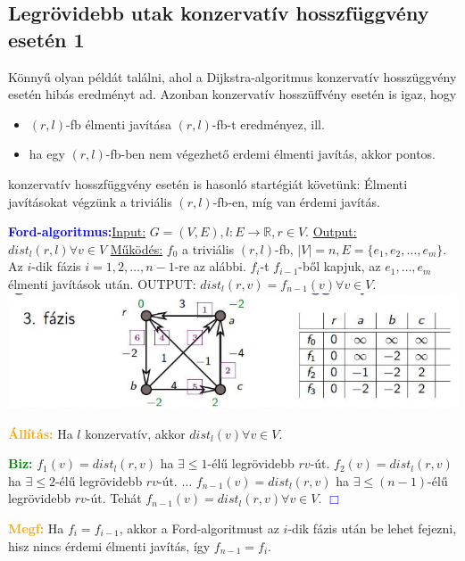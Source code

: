 \documentclass[../szamtud.tex]{subfiles}
\begin{document}
   \subsection{Legrövidebb utak konzervatív hosszfüggvény esetén 1}

        Könnyű olyan példát találni, ahol a Dijkstra-algoritmus konzervatív hosszüggvény esetén hibás eredményt ad. Azonban konzervatív hosszüffvény esetén is igaz, hogy 

        \begin{itemize}
            \item $(r,l)$-fb élmenti javítása $(r,l)$-fb-t eredményez, ill. 
            \item ha egy $(r,l)$-fb-ben nem végezhető erdemi élmenti javítás, akkor pontos.
        \end{itemize}

        konzervatív hosszfüggvény esetén is hasonló startégiát követünk: Élmenti javításokat végzünk a triviális $(r,l)$-fb-en, míg van érdemi javítás.

        \textcolor{blue}{\textbf{Ford-algoritmus:}}\underline{Input:} $G = (V,E), l:E \rightarrow \mathbb{R},r \in V$. \underline{Output:} $dist_l(r,l) \forall v \in V$ \underline{Működés:} $f_0$ a triviális $(r,l)$-fb, $|V| = n, E = \{e_1, e_2, \dots, e_m\}$. Az $i$-dik fázis $i = 1,2,\dots,n-1$-re az alábbi. $f_i$-t $f_{i-1}$-ből kapjuk, az $e_1,\dots,e_m$ élmenti javítások után. OUTPUT: $dist_l(r,v)=f_{n-1}(v) \forall v \in V$. \includegraphics[width=\textwidth]{img/1.png}

        \textcolor{orange}{\textbf{Állítás:}} Ha $l$ konzervatív, akkor $dist_l(v) \forall v \in V$.

        \textcolor{green}{\textbf{Biz:}} $f_1(v) = dist_l(r,v)$ ha $\exists \leq 1$-élű legrövidebb $rv$-út. $f_2(v) = dist_l(r,v)$ ha $\exists \leq 2$-élű legrövidebb $rv$-út. $\dots$ $f_{n-1}(v) = dist_l(r,v)$ ha $\exists \leq (n-1)$-élű legrövidebb $rv$-út. Tehát $f_{n-1}(v) = dist_l(r,v) \forall v \in V$.  \textcolor{blue}{$\Box$} 

        \textcolor{orange}{\textbf{Megf:}} Ha $f_i = f_{i-1}$, akkor a Ford-algoritmust az $i$-dik fázis után be lehet fejezni, hisz nincs érdemi élmenti javítás, így $f_{n-1} = f_i$.
\end{document}
